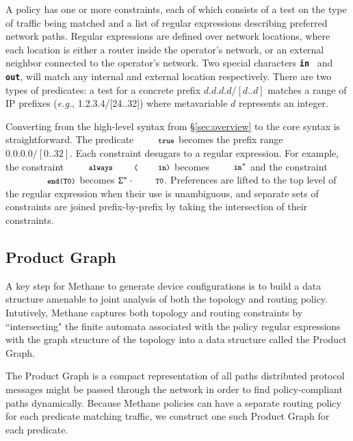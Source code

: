 \documentclass[numbers, 10pt, preprint]{sigplanconf}
\newcommand{\EG}{\emph{e.g.}}
\newcommand{\sysname}{{\small \sf Methane}\xspace}
\newcommand{\CD}[1]{\texttt{\small #1}}  %
\newcommand{\KW}[1]{\texttt{\small\bfseries{#1}}}
\newcommand{\True}{\CD{true}}
\newcommand{\Prefer}{\texttt{>>}}
\newcommand{\Path}{\texttt{=>}}
\newcommand{\In}{\KW{in}}
\newcommand{\Out}{\KW{out}}
\newcommand{\Exit}{\KW{exit}}
\newcommand{\End}{\KW{end}}
\newcommand{\Always}{\KW{always}}
\begin{document}
A policy has one or more constraints, each of which consists of a test on the type of traffic being matched and a list of regular expressions describing preferred network paths. Regular expressions are defined over network locations, where each location is either a router inside the operator's network, or an external neighbor connected to the operator's network. Two special characters \In~ and \Out, will match any internal and external location respectively. There are two types of predicates: a test for a concrete prefix $d.d.d.d/[d..d]$ matches a range of IP prefixes (\EG, 1.2.3.4/[24..32]) where metavariable $d$ represents an integer.

Converting from the high-level syntax from \S\ref{sec:overview} to the core syntax is straightforward. The predicate $\True$ becomes the prefix range $0.0.0.0/[0..32]$.
%
Each constraint desugars to a regular expression. For example, the constraint $\Always\CD{(\In)}$ becomes $\In^*$ and the constraint $\CD{\End(T0)}$ becomes $\mathtt{\Sigma}^* \cdot \CD{T0}$.
%
Preferences are lifted to the top level of the regular expression when their use is unambiguous, and separate sets of constraints are joined prefix-by-prefix by taking the intersection of their constraints.

%
%

\subsection{Product Graph}

A key step for \sysname to generate device configurations is to build a data structure amenable to joint analysis of both the topology and routing policy. Intutively, \sysname captures both topology and routing constraints by ``intersecting" the finite automata associated with the policy regular expressions with the graph structure of the topology into a data structure called the Product Graph.

The Product Graph is a compact representation of all paths distributed protocol messages might be passed through the network in order to find policy-compliant paths dynamically.
%
%
Because \sysname policies can have a separate routing policy for each predicate matching traffic, we construct one such Product Graph for each predicate.
\end{document}
